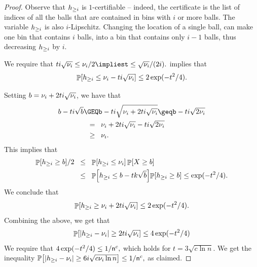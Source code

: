 \begin{proof}
    Observe that $h_{\geq i}$ is $1$-certifiable -- indeed, the
    certificate is the list of indices of all the balls that are
    contained in bins with $i$ or more balls. The variable $h_{\geq i}$
    is also $i$-Lipschitz. Changing the location of a single ball, can
    make one bin that contains $i$ balls, into a bin that contains
    only $i-1$ balls, thus decreasing $h_{\geq i}$ by $i$.

    We require that
    \begin{math}
        ti\sqrt{ \medianC_i} \leq \medianC_i/2%
        \implies%
        t \leq \sqrt{ \medianC_i}/(2i).%
    \end{math}    
     implies that
    \begin{equation}
        \Prob{ \NHX{i} \leq  \medianC_i - ti\sqrt{ \medianC_i}}%
        \leq 2\exp(-t^2/4).
        \eqlab{lower:end:t:e}
    \end{equation}

    Setting $b = \nu_i + 2 ti\sqrt{\nu_i}$, we have that
    \begin{align*}
        b- ti\sqrt{b}%
        &\GEQ%
        b - ti \sqrt{\medianC_i + 2 ti\sqrt{\medianC_i}} 
        \geq%
        b - ti \sqrt{2 \medianC_i} %
        \\&
        \EQ%
        \medianC_i + 2 ti\sqrt{\medianC_i} - ti \sqrt{2 \medianC_i}%
        \\&
        \GEQ%
        \medianC_i.        
    \end{align*}
    This implies that
    \begin{align*}
        \Prob{ \NHX{i} \geq b} /2%
        &\LEQ %
        \Prob{ \NHX{i} \leq \medianC_i} \Prob{X \geq b}%
        \\&
        \LEQ %
        \Prob{ \NHX{i} \leq b- tk\sqrt{b}}%
        \!\Prob{\NHX{i} \geq b}
        \leq%
        \exp(-t^2/4).
    \end{align*}
    We conclude that
    \begin{equation}
        \Prob{ \NHX{i} \geq \medianC_i + 2 ti\sqrt{\medianC_i}}%
        \leq 2 \exp(-t^2/4).
        \eqlab{upper:end:t:e}
    \end{equation}
    Combining the above, we get that
    \begin{equation*}
        \Prob{ \cardin{\NHX{i} - \medianC_i} \geq
           2ti\sqrt{\medianC_i}}%
        \leq 4 \exp(-t^2/4)
    \end{equation*}
    We require that 
    \begin{math}
        4 \exp(-t^2/4) \leq {1}/{\mathsf{n}^{c}},
    \end{math}
    which holds for $ t= 3\sqrt{c \ln n}$.
    We get the inequality
    \begin{math}
        \ProbLTR \bigl[ \cardin{\NHX{i} - \medianC_i} \geq 6 i\sqrt{c
           \medianC_i \ln n} \bigr]%
        \leq {1}/{\nballs^{c}},
    \end{math}
    as claimed.
    

\end{proof}

